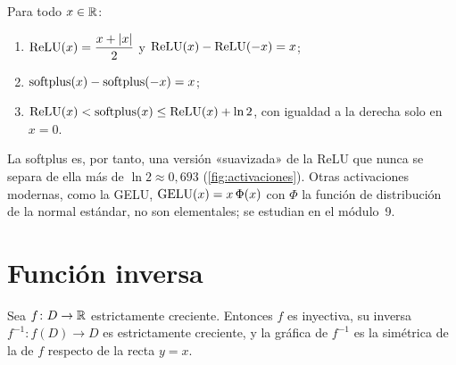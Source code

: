 \begin{proposicion}\label{prop:relu}
Para todo $x\in\mathbb{R}$:
\begin{enumerate}
  \item $\operatorname{ReLU}(x)=\dfrac{x+\lvert x\rvert}{2}$ y $\operatorname{ReLU}(x)-\operatorname{ReLU}(-x)=x$;
  \item $\operatorname{softplus}(x)-\operatorname{softplus}(-x)=x$;
  \item $\operatorname{ReLU}(x)<\operatorname{softplus}(x)\le\operatorname{ReLU}(x)+\ln 2$, con igualdad a la derecha solo en $x=0$.
\end{enumerate}
\end{proposicion}

La softplus es, por tanto, una versión «suavizada» de la ReLU que nunca se separa de ella más de $\ln 2\approx0{,}693$ (\cref{fig:activaciones}). Otras activaciones modernas, como la GELU, $\operatorname{GELU}(x)=x\,\Phi(x)$ con $\Phi$ la función de distribución de la normal estándar, no son elementales; se estudian en el módulo~9.

\section{Función inversa}

\begin{proposicion}\label{prop:inversa-monotona}
Sea $f\colon D\to\mathbb{R}$ estrictamente creciente. Entonces $f$ es inyectiva, su inversa $f^{-1}\colon f(D)\to D$ es estrictamente creciente, y la gráfica de $f^{-1}$ es la simétrica de la de $f$ respecto de la recta $y=x$.
\end{proposicion}

\addtocounter{definicion}{1}%

\addtocounter{definicion}{1}%

\addtocounter{definicion}{1}%

